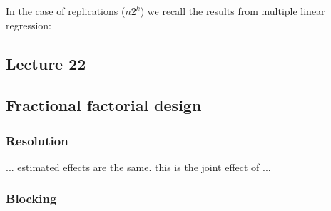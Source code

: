     
        
        
        
        




In the case of replications ($n2^k$) we recall the results from multiple linear regression:


\subsection*{Lecture  22}

\subsection{Fractional factorial design}



\subsubsection{Resolution}




 ... estimated effects are the same. this is the joint effect of ...


\subsubsection{Blocking}


